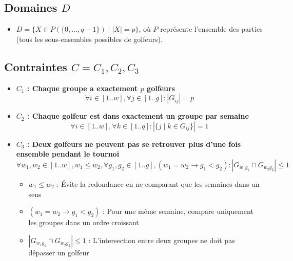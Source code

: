\documentclass{article}
\begin{document}
\subsection*{Domaines $D$}

\begin{itemize}[label=\textbullet]
    \item $D = \{X \in P(\{0, \ldots, q-1\}) \mid |X| = p\}$, \newline
          o\`u $P$ repr\'esente l'ensemble des parties (tous les sous-ensembles possibles de golfeurs).
\end{itemize}

\subsection*{Contraintes $C = C_1, C_2, C_3$}
\begin{itemize}[label=\textbullet]
   \item \textbf{$C_1$ : Chaque groupe a exactement $p$ golfeurs}
         \[ \forall i \in [1..w], \forall j \in [1..g] : |G_{ij}| = p \]
   
   \item \textbf{$C_2$ : Chaque golfeur est dans exactement un groupe par semaine}
         \[ \forall i \in [1..w], \forall k \in [1..q] : |\{j \mid k \in G_{ij}\}| = 1 \]
   
   \item \textbf{$C_3$ : Deux golfeurs ne peuvent pas se retrouver plus d'une fois ensemble pendant le tournoi}
         \[ \forall w_1, w_2 \in [1..w], w_1 \leq w_2, \forall g_1, g_2 \in [1..g], (w_1 = w_2 \rightarrow g_1 < g_2) : |G_{w_1g_1} \cap G_{w_2g_2}| \leq 1 \]
         \begin{itemize}[label=\textendash]
             \item $w_1 \leq w_2$ : Évite la redondance en ne comparant que les semaines dans un sens
             \item $(w_1 = w_2 \rightarrow g_1 < g_2)$ : Pour une même semaine, compare uniquement les groupes dans un ordre croissant
             \item $|G_{w_1g_1} \cap G_{w_2g_2}| \leq 1$ : L'intersection entre deux groupes ne doit pas dépasser un golfeur
         \end{itemize}
\end{itemize}
\end{document}
